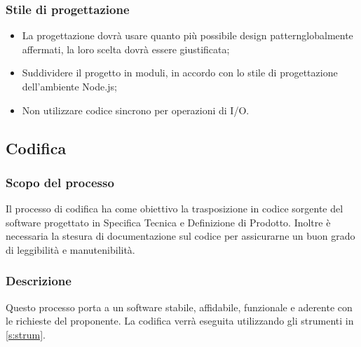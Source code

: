 \documentclass[a4paper,11pt]{article}
\begin{document}
			\subsubsection{ Stile di progettazione}
				\begin{itemize}
				\item La progettazione dovrà usare quanto più possibile design pattern\addglos globalmente affermati, la loro scelta dovrà essere giustificata;
				\item Suddividere il progetto in moduli, in accordo con lo stile di progettazione dell'ambiente Node.js\addglos;
				\item Non utilizzare codice sincrono per operazioni di I/O\addglos.
				
				\end{itemize}
			
			
		\subsection{Codifica}
			\subsubsection{Scopo del processo}
			Il processo di codifica ha come obiettivo la trasposizione in codice sorgente del software progettato in Specifica Tecnica e Definizione di Prodotto. Inoltre è necessaria la stesura di documentazione sul codice per assicurarne un buon grado di leggibilità e manutenibilità.
			\subsubsection{Descrizione}		
				Questo processo porta a un software stabile, affidabile, funzionale e aderente con le richieste del proponente. La codifica verrà eseguita utilizzando gli strumenti in \ref{s:strum}.
			
\end{document}
